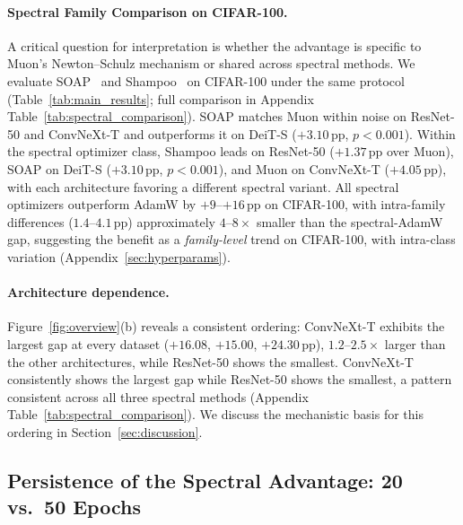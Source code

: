 \paragraph{Spectral Family Comparison on CIFAR-100.}
A critical question for interpretation is whether the advantage is specific to Muon's Newton--Schulz mechanism or shared across spectral methods.
We evaluate SOAP~\cite{vyas2025soap} and Shampoo~\cite{gupta2018shampoo} on CIFAR-100 under the same protocol (Table~\ref{tab:main_results}; full comparison in Appendix Table~\ref{tab:spectral_comparison}).
SOAP matches Muon within noise on ResNet-50 and ConvNeXt-T and outperforms it on DeiT-S ($+3.10$\,pp, $p < 0.001$).
Within the spectral optimizer class, Shampoo leads on ResNet-50 ($+1.37$\,pp over Muon), SOAP on DeiT-S ($+3.10$\,pp, $p{<}0.001$), and Muon on ConvNeXt-T ($+4.05$\,pp), with each architecture favoring a different spectral variant.
All spectral optimizers outperform AdamW by $+9$--$+16$\,pp on CIFAR-100, with intra-family differences ($1.4$--$4.1$\,pp) approximately $4$--$8\times$ smaller than the spectral-AdamW gap, suggesting the benefit as a \emph{family-level} trend on CIFAR-100, with intra-class variation (Appendix~\ref{sec:hyperparams}).

\paragraph{Architecture dependence.}
Figure~\ref{fig:overview}(b) reveals a consistent ordering: ConvNeXt-T exhibits the largest gap at every dataset ($+16.08$, $+15.00$, $+24.30$\,pp), $1.2$--$2.5\times$ larger than the other architectures, while ResNet-50 shows the smallest.
ConvNeXt-T consistently shows the largest gap while ResNet-50 shows the smallest, a pattern consistent across all three spectral methods (Appendix Table~\ref{tab:spectral_comparison}). We discuss the mechanistic basis for this ordering in Section~\ref{sec:discussion}.

\vspace{-0.3em}
\subsection{Persistence of the Spectral Advantage: 20 vs.\ 50 Epochs}
\label{sec:convergence_efficiency}

